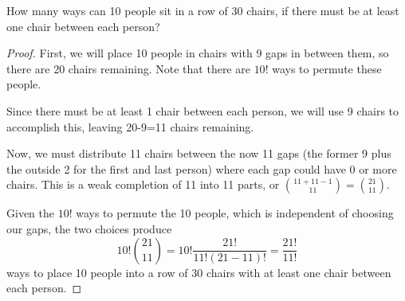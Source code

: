 \documentclass{subfiles}
\begin{document}
How many ways can 10 people sit in a row of 30 chairs, if there must be at least one chair between each person?
\begin{proof}
	First, we will place 10 people in chairs with 9 gaps in between them, so there are 20 chairs remaining.
	Note that there are $10!$ ways to permute these people.

	Since there must be at least 1 chair between each person, we will use 9 chairs to accomplish this, leaving 20-9=11 chairs remaining.

	Now, we must distribute 11 chairs between the now 11 gaps (the former 9 plus the outside 2 for the first and last person) where each gap could have 0 or more chairs.
	This is a weak completion of 11 into 11 parts, or $\binom{11 + 11 - 1}{11}=\binom{21}{11}$.

	Given the $10!$ ways to permute the 10 people, which is independent of choosing our gaps, the two choices produce
	\[
		10!\binom{21}{11}=10!\frac{21!}{11!(21-11)!}=\frac{21!}{11!}
	\] ways to place 10 people into a row of 30 chairs with at least one chair between each person.
\end{proof}
\end{document}
